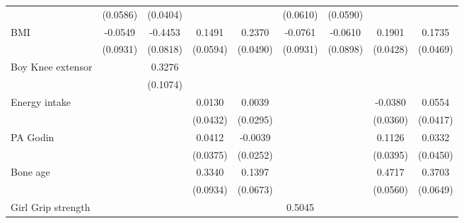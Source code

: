 \begin{table}[htbp]
\begin{tabular}{l*{8}{c}}
                              &  (0.0586)         &  (0.0404)         &                   &                   &  (0.0610)         &  (0.0590)         &                   &                   \\
[1em]
BMI                           &   -0.0549         &   -0.4453\sym{***}&    0.1491\sym{**} &    0.2370\sym{***}&   -0.0761         &   -0.0610         &    0.1901\sym{***}&    0.1735\sym{***}\\
                              &  (0.0931)         &  (0.0818)         &  (0.0594)         &  (0.0490)         &  (0.0931)         &  (0.0898)         &  (0.0428)         &  (0.0469)         \\
[1em]
Boy Knee extensor             &                   &    0.3276\sym{***}&                   &                   &                   &                   &                   &                   \\
                              &                   &  (0.1074)         &                   &                   &                   &                   &                   &                   \\
[1em]
Energy intake                 &                   &                   &    0.0130         &    0.0039         &                   &                   &   -0.0380         &    0.0554         \\
                              &                   &                   &  (0.0432)         &  (0.0295)         &                   &                   &  (0.0360)         &  (0.0417)         \\
[1em]
PA Godin                      &                   &                   &    0.0412         &   -0.0039         &                   &                   &    0.1126\sym{***}&    0.0332         \\
                              &                   &                   &  (0.0375)         &  (0.0252)         &                   &                   &  (0.0395)         &  (0.0450)         \\
[1em]
Bone age                      &                   &                   &    0.3340\sym{***}&    0.1397\sym{**} &                   &                   &    0.4717\sym{***}&    0.3703\sym{***}\\
                              &                   &                   &  (0.0934)         &  (0.0673)         &                   &                   &  (0.0560)         &  (0.0649)         \\
[1em]
Girl Grip strength            &                   &                   &                   &                   &    0.5045\sym{***}&                   &                   &                   \\

\end{tabular}
\end{table}
